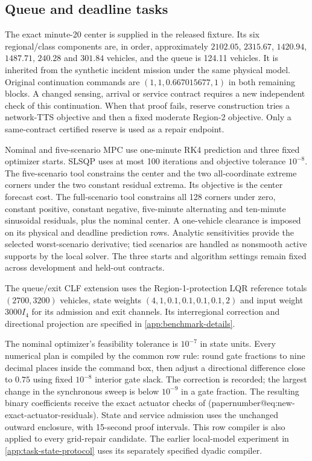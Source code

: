 \documentclass[preprint,12pt]{elsarticle}
\makeatletter
\newcommand{\appref}[1]{\ref{#1}}
\numberwithin{equation}{section}
\newcommand{\papernumber}[1]{\csname papernumber@#1\endcsname}
\makeatother
\begin{document}
\subsection{Queue and deadline tasks}
\label{sec:supp-queue-settings}
The exact minute-20 center is supplied in the released fixture. Its
six regional/class components are, in order, approximately
$2102.05$, $2315.67$, $1420.94$, $1487.71$, $240.28$ and $301.84$
vehicles, and the
queue is 124.11 vehicles. It is inherited from the synthetic incident
mission under the same physical model. Original continuation commands
are $(1,1,0.667015677,1)$ in both remaining blocks. A changed sensing,
arrival or service contract requires a new independent check of this
continuation. When that proof fails, reserve construction tries a
network-TTS objective and then a fixed moderate Region-2 objective.
Only a same-contract certified reserve is used as a repair endpoint.

Nominal and five-scenario MPC use one-minute RK4 prediction and three
fixed optimizer starts. SLSQP uses at most 100 iterations and objective
tolerance $10^{-8}$. The five-scenario tool constrains the center and
the two all-coordinate extreme corners under the two constant residual
extrema. Its objective is the center forecast cost. The full-scenario
tool constrains all 128 corners under zero, constant positive, constant
negative, five-minute alternating and ten-minute sinusoidal residuals,
plus the nominal center. A one-vehicle clearance is imposed on its
physical and deadline prediction rows. Analytic sensitivities provide
the selected worst-scenario derivative; tied scenarios are handled as
nonsmooth active supports by the local solver. The three starts and
algorithm settings remain fixed across development and held-out
contracts.

The queue/exit CLF extension uses the Region-1-protection LQR reference
totals $(2700,3200)$ vehicles, state weights
$(4,1,0.1,0.1,0.1,0.1,2)$ and input weight $3000I_4$ for its admission
and exit channels. Its interregional correction and directional
projection are specified in \appref{app:benchmark-details}.

The nominal optimizer's feasibility tolerance is $10^{-7}$ in state
units. Every numerical plan is compiled by the common row rule:
round gate fractions to nine decimal places inside the command box,
then adjust a directional difference close to $0.75$ using fixed
$10^{-8}$ interior gate slack. The correction is recorded; the largest
change in the synchronous sweep is below $10^{-9}$ in a gate fraction.
The resulting binary coefficients
receive the exact actuator checks of
(\papernumber{eq:new-exact-actuator-residuals}). State and service admission
uses the unchanged outward enclosure, with 15-second proof intervals.
This row compiler is also applied to every grid-repair candidate.
The earlier local-model experiment in
\appref{app:task-state-protocol} uses its separately specified dyadic
compiler.
\end{document}
